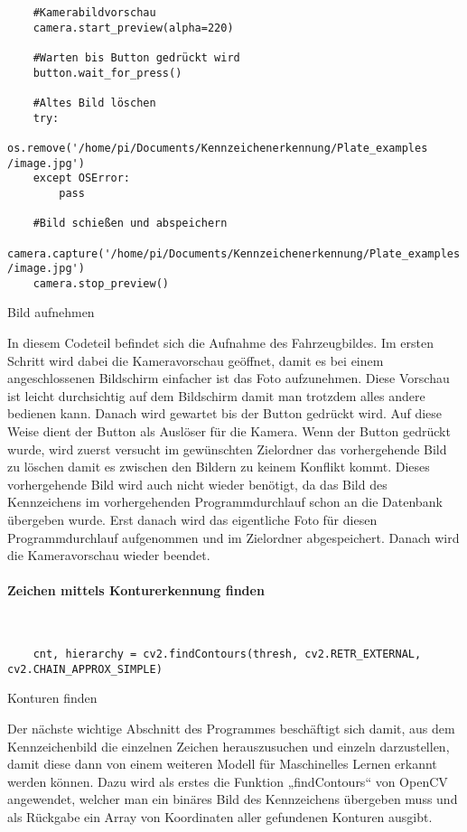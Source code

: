 \begin{longlisting}
    \begin{verbatim}
    #Kamerabildvorschau
    camera.start_preview(alpha=220)

    #Warten bis Button gedrückt wird
    button.wait_for_press()

    #Altes Bild löschen
    try:
        os.remove('/home/pi/Documents/Kennzeichenerkennung/Plate_examples /image.jpg')
    except OSError:
        pass

    #Bild schießen und abspeichern 
    camera.capture('/home/pi/Documents/Kennzeichenerkennung/Plate_examples /image.jpg')
    camera.stop_preview()
    \end{verbatim}
    \caption{Bild aufnehmen}
\end{longlisting}

In diesem Codeteil befindet sich die Aufnahme des Fahrzeugbildes. Im ersten Schritt wird dabei die Kameravorschau geöffnet, damit es 
bei einem angeschlossenen Bildschirm einfacher ist das Foto aufzunehmen. Diese Vorschau ist leicht durchsichtig auf dem Bildschirm 
damit man trotzdem alles andere bedienen kann. Danach wird gewartet bis der Button gedrückt wird. Auf diese Weise dient der Button als 
Auslöser für die Kamera. Wenn der Button gedrückt wurde, wird zuerst versucht im gewünschten Zielordner das vorhergehende Bild zu löschen 
damit es zwischen den Bildern zu keinem Konflikt kommt. Dieses vorhergehende Bild wird auch nicht wieder benötigt, da das Bild des 
Kennzeichens im vorhergehenden Programmdurchlauf schon an die Datenbank übergeben wurde. Erst danach wird das eigentliche Foto für 
diesen Programmdurchlauf aufgenommen und im Zielordner abgespeichert. Danach wird die Kameravorschau wieder beendet.

\paragraph{Zeichen mittels Konturerkennung finden}\mbox{}\\

\begin{listing}[H]
    \begin{verbatim}
    cnt, hierarchy = cv2.findContours(thresh, cv2.RETR_EXTERNAL, cv2.CHAIN_APPROX_SIMPLE)
    \end{verbatim}
    \caption{Konturen finden}
\end{listing}

Der nächste wichtige Abschnitt des Programmes beschäftigt sich damit, aus dem Kennzeichenbild die einzelnen Zeichen herauszusuchen und einzeln 
darzustellen, damit diese dann von einem weiteren Modell für Maschinelles Lernen erkannt werden können. Dazu wird als erstes die Funktion „findContours“ 
von OpenCV angewendet, welcher man ein binäres Bild des Kennzeichens übergeben muss und als Rückgabe ein Array von Koordinaten aller gefundenen Konturen ausgibt. 

